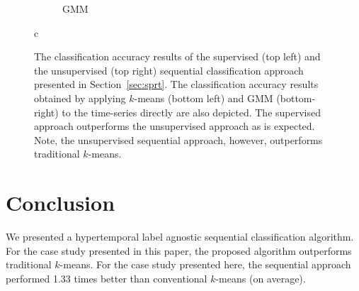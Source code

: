 \documentclass{article}
\begin{document}
\begin{figure}[h]
\begin{subfigure}[b]{0.49\linewidth}
    \caption{GMM} 
    \label{fig7:d} 
  \end{subfigure} 
  \caption{c}
  \label{fig7} 
  \caption{The classification accuracy results of the supervised (top left) and the unsupervised (top right) sequential classification approach presented in Section~\ref{sec:sprt}. The classification
  accuracy results obtained by applying $k$-means (bottom left) and GMM (bottom-right) to the time-series directly are also depicted. The supervised approach outperforms the 
  unsupervised approach as is expected. Note, the unsupervised sequential approach, however, outperforms traditional $k$-means.}
  \label{fig:results}
\end{figure}

\section{Conclusion}
\label{sec:ref}
We presented a hypertemporal label agnostic sequential classification algorithm. For the case study presented in this paper, the proposed algorithm 
outperforms traditional $k$-means. For the case study presented here, the sequential approach performed 1.33 times better than conventional $k$-means (on average). 




\end{document}
